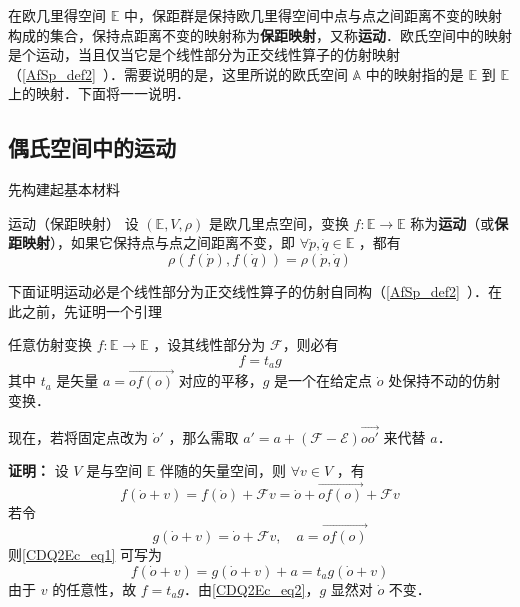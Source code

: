 
\begin{issues}
\issueDraft
\end{issues}

在欧几里得空间 $\mathbb E$ 中，保距群是保持欧几里得空间中点与点之间距离不变的映射构成的集合，保持点距离不变的映射称为\textbf{保距映射}，又称\textbf{运动}．欧氏空间中的映射是个运动，当且仅当它是个线性部分为正交线性算子的仿射映射（\autoref{AfSp_def2}~）．需要说明的是，这里所说的欧氏空间 $\mathbb A$ 中的映射指的是 $\mathbb E$ 到 $\mathbb E$ 上的映射．下面将一一说明．
\subsection{偶氏空间中的运动}
先构建起基本材料
\begin{definition}{运动（保距映射）}
设 $(\mathbb E,V,\rho)$ 是欧几里点空间，变换 $f:\mathbb E\rightarrow\mathbb E$ 称为\textbf{运动}（或\textbf{保距映射}），如果它保持点与点之间距离不变，即 $\forall \dot p,\dot q\in\mathbb E$ ，都有
\begin{equation}
\rho(f(\dot p),f(\dot q))=\rho(\dot p,\dot q)
\end{equation}
\end{definition}
下面证明运动必是个线性部分为正交线性算子的仿射自同构（\autoref{AfSp_def2}~）．在此之前，先证明一个引理
\begin{lemma}{}
任意仿射变换 $f:\mathbb E\rightarrow\mathbb E$ ，设其线性部分为 $\mathcal F$，则必有
\begin{equation}
f=t_a g
\end{equation}
其中 $t_a$ 是矢量 $a=\overrightarrow{of(o)}$ 对应的平移，$g$ 是一个在给定点 $\dot o$ 处保持不动的仿射变换．

现在，若将固定点改为 $\dot o'$ ，那么需取 $a'=a+(\mathcal F-\mathcal E)\overrightarrow{oo'}$ 来代替 $a$．
\end{lemma}

\textbf{证明：} 设 $V$ 是与空间 $\mathbb E$ 伴随的矢量空间，则 $\forall v\in V$ ，有
\begin{equation}\label{CDQ2Ec_eq1}
f(\dot o+v)=f(\dot o)+\mathcal F v=\dot o+\overrightarrow{of(o)}+\mathcal F v
\end{equation}
若令
\begin{equation}\label{CDQ2Ec_eq2}
g(\dot o+v)=\dot o+\mathcal F v,\quad a=\overrightarrow{of(o)}
\end{equation}
则\autoref{CDQ2Ec_eq1} 可写为
\begin{equation}
f(\dot o+v)=g(\dot o+v)+a=t_a g(\dot o+v)
\end{equation}
由于 $v$ 的任意性，故 $f=t_ag$．由\autoref{CDQ2Ec_eq2}，$g$ 显然对 $\dot o$ 不变．

